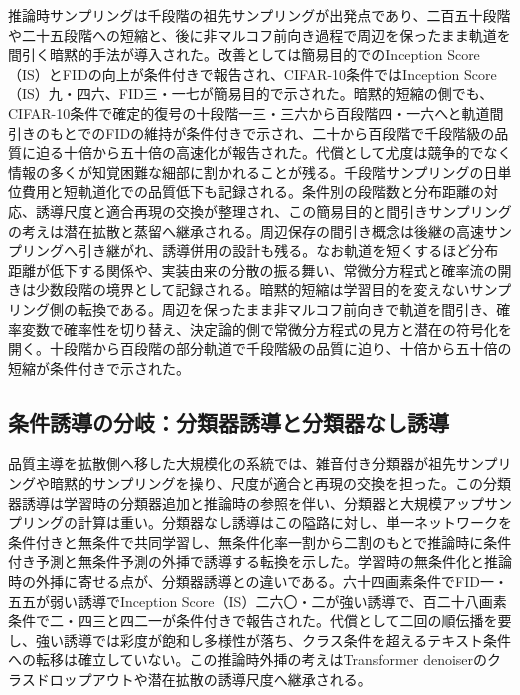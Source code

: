 \documentclass[lualatex,a4paper,10pt]{jlreq}
\begin{document}
推論時サンプリングは千段階の祖先サンプリングが出発点であり、二百五十段階や二十五段階への短縮と、後に非マルコフ前向き過程で周辺を保ったまま軌道を間引く暗黙的手法が導入された\autocite{btd030,btd020}。改善としては簡易目的でのInception Score（IS）とFIDの向上が条件付きで報告され\autocite{btd019}、CIFAR-10条件ではInception Score（IS）九・四六、FID三・一七が簡易目的で示された\autocite{btd019}。暗黙的短縮の側でも、CIFAR-10条件で確定的復号の十段階一三・三六から百段階四・一六へと軌道間引きのもとでのFIDの維持が条件付きで示され、二十から百段階で千段階級の品質に迫る十倍から五十倍の高速化が報告された\autocite{btd020}。代償として尤度は競争的でなく情報の多くが知覚困難な細部に割かれることが残る\autocite{btd019}。千段階サンプリングの日単位費用と短軌道化での品質低下も記録される。条件別の段階数と分布距離の対応、誘導尺度と適合再現の交換が整理され、この簡易目的と間引きサンプリングの考えは潜在拡散と蒸留へ継承される。周辺保存の間引き概念は後継の高速サンプリングへ引き継がれ、誘導併用の設計も残る。なお軌道を短くするほど分布距離が低下する関係や、実装由来の分散の振る舞い、常微分方程式と確率流の開きは少数段階の境界として記録される。暗黙的短縮は学習目的を変えないサンプリング側の転換である\autocite{btd020}。周辺を保ったまま非マルコフ前向きで軌道を間引き、確率変数で確率性を切り替え、決定論的側で常微分方程式の見方と潜在の符号化を開く\autocite{btd020}。十段階から百段階の部分軌道で千段階級の品質に迫り、十倍から五十倍の短縮が条件付きで示された\autocite{btd020}。

\subsection{条件誘導の分岐：分類器誘導と分類器なし誘導}
品質主導を拡散側へ移した大規模化の系統では、雑音付き分類器が祖先サンプリングや暗黙的サンプリングを操り、尺度が適合と再現の交換を担った\autocite{btd030}。この分類器誘導は学習時の分類器追加と推論時の参照を伴い、分類器と大規模アップサンプリングの計算は重い\autocite{btd030}。分類器なし誘導はこの隘路に対し、単一ネットワークを条件付きと無条件で共同学習し、無条件化率一割から二割のもとで推論時に条件付き予測と無条件予測の外挿で誘導する転換を示した\autocite{btd032}。学習時の無条件化と推論時の外挿に寄せる点が、分類器誘導との違いである\autocite{btd030,btd032}。六十四画素条件でFID一・五五が弱い誘導でInception Score（IS）二六〇・二が強い誘導で、百二十八画素条件で二・四三と四二一が条件付きで報告された\autocite{btd032}。代償として二回の順伝播を要し、強い誘導では彩度が飽和し多様性が落ち、クラス条件を超えるテキスト条件への転移は確立していない\autocite{btd032}。この推論時外挿の考えはTransformer denoiserのクラスドロップアウトや潜在拡散の誘導尺度へ継承される\autocite{btd023,btd025,btd032}。
\end{document}
